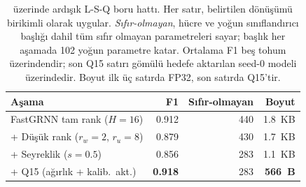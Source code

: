 \begin{table}[t]
\centering
\caption{\hapt{} üzerinde ardışık L-S-Q boru hattı. Her satır,
belirtilen dönüşümü birikimli olarak uygular. \emph{Sıfır-olmayan},
hücre ve yoğun sınıflandırıcı başlığı dahil tüm sıfır olmayan
parametreleri sayar; başlık her aşamada 102 yoğun parametre katar.
Ortalama F1 beş tohum üzerindendir; son Q15 satırı gömülü hedefe
aktarılan seed-0 modeli üzerindedir. Boyut ilk üç satırda FP32,
son satırda Q15'tir.}
\label{tab:lsq}
\setlength{\tabcolsep}{4pt}
\begin{tabular}{@{}lrrr@{}}
\toprule
Aşama & F1 & Sıfır-olmayan & Boyut \\
\midrule
FastGRNN tam rank ($H{=}16$)        & 0.912          & 440 & 1.8~KB \\
+ Düşük rank ($r_w{=}2$, $r_u{=}8$) & 0.879          & 430 & 1.7~KB \\
+ Seyreklik ($s{=}0.5$)             & 0.856          & 283 & 1.1~KB \\
+ Q15 (ağırlık + kalib.\ akt.)      & \textbf{0.918} & 283 & \textbf{566~B} \\
\bottomrule
\end{tabular}
\end{table}

\begin{table}[t]
\centering
\caption{\hapt{} üzerinde tohum bazlı L-S-Q boru hattı (3{,}399 test
penceresi). \emph{Q15/LUT F1}: PyTorch benzetimi, Q15 ağırlık +
kalibre aktivasyon nicelendirme (\S\ref{sec:method:q15}).
\emph{Uyuşma}: PyTorch-FP32 ile NumPy-Q15 argmax eşleşme oranı
(C-eşdeğer harness, bare-metal MCU değil; seed-0 MCU uyuşması
\%100, Tablo~\ref{tab:hstate}). Tohum~1, tüm aşamalarda
tutarlı yakınsama aykırısıdır (bkz. Şekil~\ref{fig:lowrank});
ortalama$\pm$SS bunu dahil eder. IHT maskesi $s{=}0.5$ seyrekliğini
zorunlu kıldığından tüm tohumlarda sıfır olmayan sayı ve bayt
aynıdır.}
\label{tab:multiseed}
\end{table}

